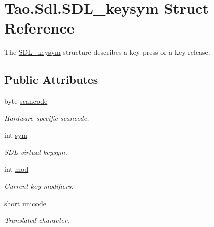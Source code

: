 \hypertarget{struct_tao_1_1_sdl_1_1_s_d_l__keysym}{
\section{Tao.Sdl.SDL\_\-keysym Struct Reference}
\label{struct_tao_1_1_sdl_1_1_s_d_l__keysym}
}


The \hyperlink{struct_tao_1_1_sdl_1_1_s_d_l__keysym}{SDL\_\-keysym} structure describes a key press or a key release.  


\subsection*{Public Attributes}
\begin{DoxyCompactItemize}
\item 
byte \hyperlink{struct_tao_1_1_sdl_1_1_s_d_l__keysym_a3ba972808fbb5cfb97404c6cc03d714f}{scancode}
\begin{DoxyCompactList}\small\item\em Hardware specific scancode. \item\end{DoxyCompactList}\item 
int \hyperlink{struct_tao_1_1_sdl_1_1_s_d_l__keysym_a4169071617ea2b244051e777821fa510}{sym}
\begin{DoxyCompactList}\small\item\em SDL virtual keysym. \item\end{DoxyCompactList}\item 
int \hyperlink{struct_tao_1_1_sdl_1_1_s_d_l__keysym_a8588d3a5bd0f8a8af5f1618fdfc6251f}{mod}
\begin{DoxyCompactList}\small\item\em Current key modifiers. \item\end{DoxyCompactList}\item 
short \hyperlink{struct_tao_1_1_sdl_1_1_s_d_l__keysym_a4a37b543b411bdd71204b270e3f0bd76}{unicode}
\begin{DoxyCompactList}\small\item\em Translated character. \item\end{DoxyCompactList}\end{DoxyCompactItemize}


